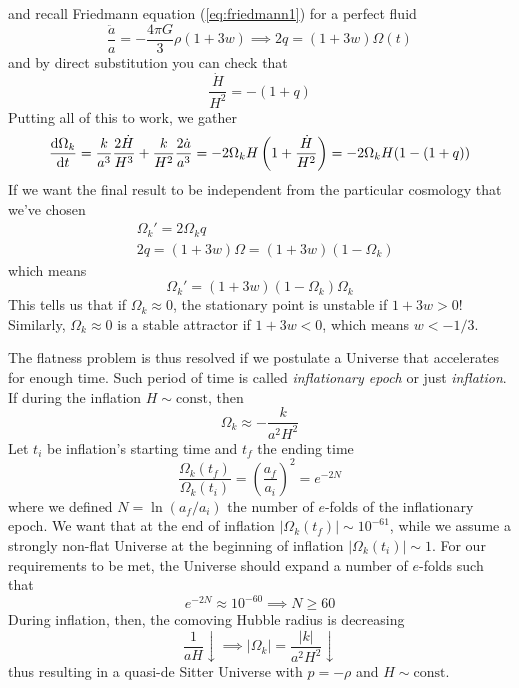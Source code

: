 and recall Friedmann equation (\ref{eq:friedmann1}) for a perfect fluid
\begin{equation}
    \frac{\ddot{a}}{a} = -\frac{4\pi G}{3}\rho (1+3w) \implies 2q = (1+3w)\Omega(t)
\end{equation}
and by direct substitution you can check that 
\begin{equation}
    \frac{\dot{H}}{H^{2}} = -(1+q)
\end{equation}
Putting all of this to work, we gather 
\begin{equation}
    \frac{\text{d}\Omega_{k}}{\text{d}t} = \frac{k}{a^{3}}\frac{2\dot{H}}{H^{3}} + \frac{k}{H^{2}}\frac{2\dot{a}}{a^{3}} = -2\Omega_{k}H\left(1+\frac{\dot{H}}{H^{2}}\right) = -2\Omega_{k}H(1-(1+q))
\end{equation}
If we want the final result to be independent from the particular cosmology that we've chosen 
\begin{align}
    & \Omega_{k}' = 2\Omega_{k}q \\
    & 2q = (1+3w)\Omega = (1+3w)(1-\Omega_{k})
\end{align}
which means 
\begin{equation}
    \boxed{
        \Omega_{k}' = (1+3w)(1-\Omega_{k})\Omega_{k}
    }
\end{equation}
This tells us that if $\Omega_{k}\approx 0$, the stationary point is unstable if $1+3w > 0$! Similarly, $\Omega_{k}\approx 0$ is a stable attractor if $1+3w < 0$, which means $w < -1/3$.
\par The flatness problem is thus resolved if we postulate a Universe that accelerates for enough time. Such period of time is called \emph{inflationary epoch} or just \emph{inflation}. If during the inflation $H \sim \text{const,}$ then 
\begin{equation}
    \Omega_{k} \approx -\frac{k}{a^{2}H^{2}}
\end{equation}
Let $t_{i}$ be inflation's starting time and $t_{f}$ the ending time
\begin{equation}
    \frac{\Omega_{k}(t_{f})}{\Omega_{k}(t_{i})} = \left(\frac{a_{f}}{a_{i}}\right)^{2} = e^{-2N}
\end{equation}
where we defined $N = \ln(a_{f}/a_{i})$ the number of $e$-folds of the inflationary epoch. We want that at the end of inflation $|\Omega_{k}(t_{f})|\sim 10^{-61}$, while we assume a strongly non-flat Universe at the beginning of inflation $|\Omega_{k}(t_{i})|\sim 1$. For our requirements to be met, the Universe should expand a number of $e$-folds such that
\begin{equation}
    e^{-2N} \approx 10^{-60} \implies N \geq 60
\end{equation}
During inflation, then, the comoving Hubble radius is decreasing 
\begin{equation}
    \boxed{
    \frac{1}{aH} \downarrow \implies |\Omega_{k}| = \frac{|k|}{a^{2}H^{2}}\downarrow
    }
    \label{eq:solvedfp}
\end{equation}
thus resulting in a quasi-de Sitter Universe with $p=-\rho$ and $H \sim \text{const.}$

